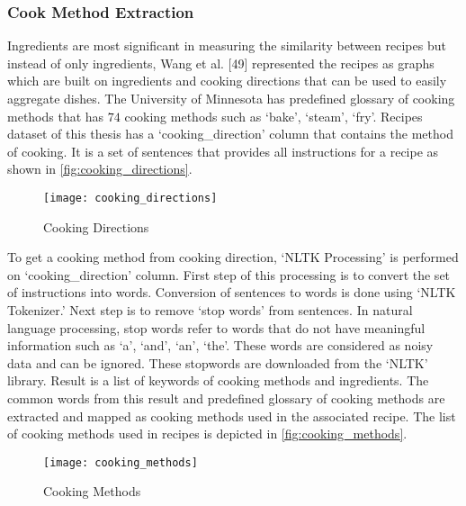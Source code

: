 \subsubsection{Cook Method Extraction}
\label{sec:cook_method}
Ingredients are most significant in measuring the similarity between recipes but instead of only ingredients, Wang et al. [49] represented the recipes as graphs which are built on ingredients and cooking directions that can be used to easily aggregate dishes. 
The University of Minnesota has predefined glossary of cooking methods \cite{50} that has $74$ cooking methods such as `bake', `steam', `fry'. Recipes dataset of this thesis has a `cooking\_direction' column that contains the method of cooking. It is a set of sentences that provides all instructions for a recipe as shown in \autoref{fig:cooking_directions}.
\begin{singlespace}
\begin{figure}[H]
	\centering
	\texttt{[image: cooking\_directions]}
	\caption{Cooking Directions }
	\label{fig:cooking_directions}
\end{figure}
\end{singlespace}

\noindent To get a cooking method from cooking direction, `NLTK Processing' is performed on `cooking\_direction' column.  First step of this processing is to convert the set of instructions into words. Conversion of sentences to words is done using `NLTK Tokenizer.' Next step is to remove `stop words' from sentences. In natural language processing, stop words refer to words that do not have meaningful information such as `a', `and', `an', `the'. These words are considered as noisy data and can be ignored. These stopwords are downloaded from the `NLTK' library. Result is a list of keywords of cooking methods and ingredients. The common words from this result and predefined glossary of cooking methods are extracted and mapped as cooking methods used in the associated recipe. The list of cooking methods used in recipes is depicted in \autoref{fig:cooking_methods}.
\begin{singlespace}
\begin{figure}[H]
	\centering
	\texttt{[image: cooking\_methods]}
	\caption{Cooking Methods }
	\label{fig:cooking_methods}
\end{figure}  
\end{singlespace}

